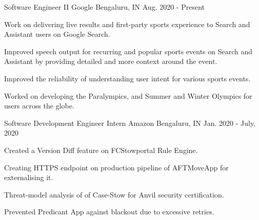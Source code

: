 


\begin{cventries}


\cventry
{Software Engineer II} %
{Google} %
{Bengaluru, IN} %
{Aug. 2020 - Present} %
{ %
\begin{cvitems}
\item {Work on delivering live results and first-party sports experience to Search and Assistant users on Google Search.}
\item {Improved speech output for recurring and popular sports events on Search and Assistant by providing detailed and more context around the event.}
\item {Improved the reliability of understanding user intent for various sports events.}
\item {Worked on developing the Paralympics, and Summer and Winter Olympics for users across the globe.}
\end{cvitems}
}


\cventry
{Software Development Engineer Intern} %
{Amazon} %
{Bengaluru, IN} %
{Jan. 2020 - July, 2020} %
{ %
\begin{cvitems}
\item {Created a Version Diff feature on FCStowportal Rule Engine.}
\item {Creating HTTPS endpoint on production pipeline of AFTMoveApp for externalising it.}
\item {Threat-model analysis of of Case-Stow for Anvil security certification.}
\item {Prevented Predicant App against blackout due to excessive retries.}
\end{cvitems}
}


\end{cventries}